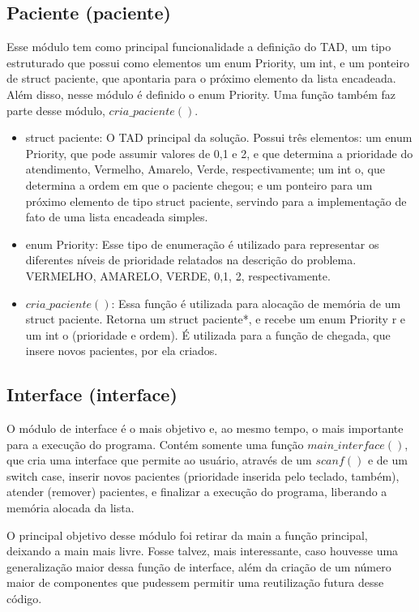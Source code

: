 \documentclass{article}
\begin{document}
\subsection{Paciente (paciente)}
Esse módulo tem como principal funcionalidade a definição do TAD, um tipo estruturado que possui como elementos um enum Priority, um int, e um ponteiro de struct paciente, que apontaria para o próximo elemento da lista encadeada. Além disso, nesse módulo é definido o enum Priority. Uma função também faz parte desse módulo, $cria\_paciente()$.
\begin{itemize}
\item struct paciente:
O TAD principal da solução. Possui três elementos: um enum Priority, que pode assumir valores de 0,1 e 2, e que determina a prioridade do atendimento, Vermelho, Amarelo, Verde, respectivamente; um int o, que determina a ordem em que o paciente chegou; e um ponteiro para um próximo elemento de tipo struct paciente, servindo para a implementação de fato de uma lista encadeada simples. 

\item enum Priority:
Esse tipo de enumeração é utilizado para representar os diferentes níveis de prioridade relatados na descrição do problema. VERMELHO, AMARELO, VERDE, 0,1, 2, respectivamente. 

\item $cria\_paciente()$:
Essa função é utilizada para alocação de memória de um struct paciente. Retorna um struct paciente*, e recebe um enum Priority r e um int o (prioridade e ordem). É utilizada para a função de chegada, que insere novos pacientes, por ela criados.
\end{itemize}

\subsection{Interface (interface)}
O módulo de interface é o mais objetivo e, ao mesmo tempo, o mais importante para a execução do programa. Contém somente uma função $main\_interface()$, que cria uma interface que permite ao usuário, através de um $scanf()$ e de um switch case, inserir novos pacientes (prioridade inserida pelo teclado, também), atender (remover) pacientes, e finalizar a execução do programa, liberando a memória alocada da lista. 

O principal objetivo desse módulo foi retirar da main a função principal, deixando a main mais livre. Fosse talvez, mais interessante, caso houvesse uma generalização maior dessa função de interface, além da criação de um número maior de componentes que pudessem permitir uma reutilização futura desse código. 
\end{document}
